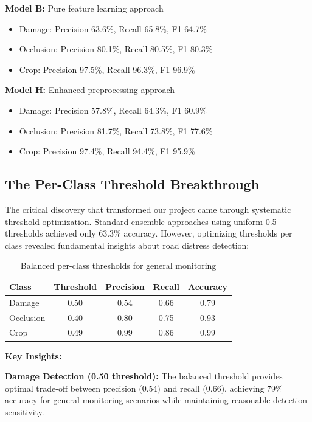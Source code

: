 \documentclass[12pt,twocolumn]{article}
\begin{document}
\noindent\textbf{Model B:} Pure feature learning approach
\begin{itemize}[itemsep=1pt,parsep=0pt,topsep=2pt]
\item Damage: Precision 63.6\%, Recall 65.8\%, F1 64.7\%
\item Occlusion: Precision 80.1\%, Recall 80.5\%, F1 80.3\%
\item Crop: Precision 97.5\%, Recall 96.3\%, F1 96.9\%
\end{itemize}

\noindent\textbf{Model H:} Enhanced preprocessing approach
\begin{itemize}[itemsep=1pt,parsep=0pt,topsep=2pt]
\item Damage: Precision 57.8\%, Recall 64.3\%, F1 60.9\%
\item Occlusion: Precision 81.7\%, Recall 73.8\%, F1 77.6\%
\item Crop: Precision 97.4\%, Recall 94.4\%, F1 95.9\%
\end{itemize}

\subsection{The Per-Class Threshold Breakthrough}

The critical discovery that transformed our project came through systematic threshold optimization. Standard ensemble approaches using uniform 0.5 thresholds achieved only 63.3\% accuracy. However, optimizing thresholds per class revealed fundamental insights about road distress detection:

\begin{table}[!h]
\centering
\footnotesize
\begin{tabular}{lcccc}
\toprule
\textbf{Class} & \textbf{Threshold} & \textbf{Precision} & \textbf{Recall} & \textbf{Accuracy} \\
\midrule
Damage & 0.50 & 0.54 & 0.66 & 0.79 \\
Occlusion & 0.40 & 0.80 & 0.75 & 0.93 \\
Crop & 0.49 & 0.99 & 0.86 & 0.99 \\
\bottomrule
\end{tabular}
\caption{Balanced per-class thresholds for general monitoring}
\end{table}

\noindent\textbf{Key Insights:}

\textbf{Damage Detection (0.50 threshold):} The balanced threshold provides optimal trade-off between precision (0.54) and recall (0.66), achieving 79\% accuracy for general monitoring scenarios while maintaining reasonable detection sensitivity.
\end{document}
